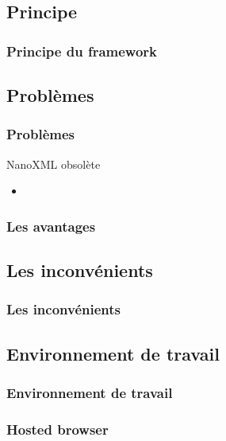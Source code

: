 \subsection{Principe}
\begin{frame}\frametitle{Principe du framework}
\end{frame}
\subsection{Problèmes}
\begin{frame}\frametitle{Problèmes}
\begin{box}{NanoXML obsolète}
\begin{itemize}
 \item 
\end{itemize}

\end{box}

\end{frame}
 \begin{frame}\frametitle{Les avantages}
\end{frame}
\subsection{Les inconvénients}
\begin{frame}\frametitle{Les inconvénients}
\end{frame}
\subsection{Environnement de travail}
\begin{frame}\frametitle{Environnement de travail}
\end{frame}
\begin{frame}\frametitle{Hosted browser}
\end{frame}
